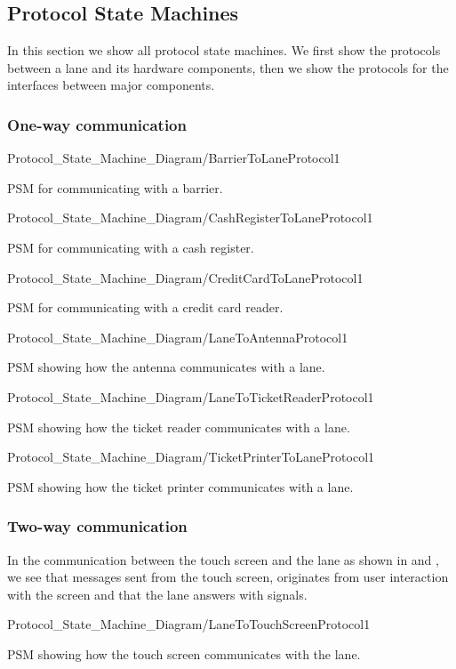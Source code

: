 \subsection{Protocol State Machines}
\madeby{\jb}{\mt}
In this section we show all protocol state machines. We first show the protocols between a lane and its hardware components, then we show the protocols for the interfaces between major components.

\subsubsection{One-way communication}
\begin{myfigure}{Protocol_State_Machine_Diagram/BarrierToLaneProtocol}{1}
\caption{PSM for communicating with a barrier. \madeby{\kj}{\mb}}
\end{myfigure}

\begin{myfigure}{Protocol_State_Machine_Diagram/CashRegisterToLaneProtocol}{1}
\caption{PSM for communicating with a cash register. \madeby{\af}{\mt}}
\end{myfigure}

\begin{myfigure}{Protocol_State_Machine_Diagram/CreditCardToLaneProtocol}{1}
\caption{PSM for communicating with a credit card reader. \madeby{\jb}{\mt}}
\end{myfigure}

\begin{myfigure}{Protocol_State_Machine_Diagram/LaneToAntennaProtocol}{1}
\caption{PSM showing how the antenna communicates with a lane.\madeby{\af}{\kj}}
\end{myfigure}

\begin{myfigure}{Protocol_State_Machine_Diagram/LaneToTicketReaderProtocol}{1}
\caption{PSM showing how the ticket reader communicates with a lane.\madeby{\mb}{\mt}}
\end{myfigure}

\begin{myfigure}{Protocol_State_Machine_Diagram/TicketPrinterToLaneProtocol}{1}
\caption{PSM showing how the ticket printer communicates with a lane.\madeby{\jb}{\af}}
\end{myfigure}

\subsubsection{Two-way communication}
\madeby{\af}{\jb}
In the communication between the touch screen and the lane as shown in  and , we see that messages sent from the touch screen, originates from user interaction with the screen and that the lane answers with signals.
\begin{myfigure}{Protocol_State_Machine_Diagram/LaneToTouchScreenProtocol}{1}
\caption{PSM showing how the touch screen communicates with the lane. \madeby{\kj}{\jb}}
\label{fig:LTS}
\end{myfigure}


